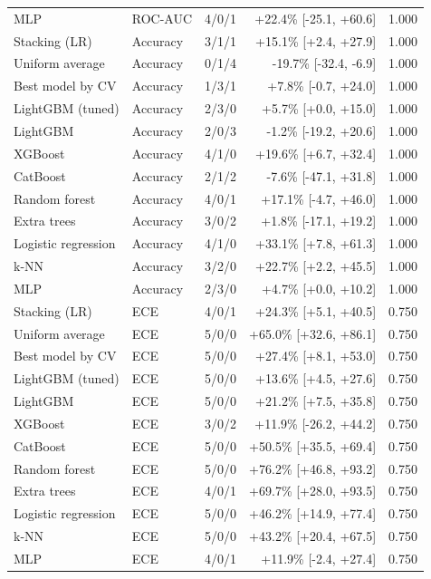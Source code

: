 \begin{tabular}{llcrr}
MLP & ROC-AUC & 4/0/1 & +22.4\% [-25.1, +60.6] & 1.000\\
Stacking (LR) & Accuracy & 3/1/1 & +15.1\% [+2.4, +27.9] & 1.000\\
Uniform average & Accuracy & 0/1/4 & -19.7\% [-32.4, -6.9] & 1.000\\
Best model by CV & Accuracy & 1/3/1 & +7.8\% [-0.7, +24.0] & 1.000\\
LightGBM (tuned) & Accuracy & 2/3/0 & +5.7\% [+0.0, +15.0] & 1.000\\
LightGBM & Accuracy & 2/0/3 & -1.2\% [-19.2, +20.6] & 1.000\\
XGBoost & Accuracy & 4/1/0 & +19.6\% [+6.7, +32.4] & 1.000\\
CatBoost & Accuracy & 2/1/2 & -7.6\% [-47.1, +31.8] & 1.000\\
Random forest & Accuracy & 4/0/1 & +17.1\% [-4.7, +46.0] & 1.000\\
Extra trees & Accuracy & 3/0/2 & +1.8\% [-17.1, +19.2] & 1.000\\
Logistic regression & Accuracy & 4/1/0 & +33.1\% [+7.8, +61.3] & 1.000\\
k-NN & Accuracy & 3/2/0 & +22.7\% [+2.2, +45.5] & 1.000\\
MLP & Accuracy & 2/3/0 & +4.7\% [+0.0, +10.2] & 1.000\\
Stacking (LR) & ECE & 4/0/1 & +24.3\% [+5.1, +40.5] & 0.750\\
Uniform average & ECE & 5/0/0 & +65.0\% [+32.6, +86.1] & 0.750\\
Best model by CV & ECE & 5/0/0 & +27.4\% [+8.1, +53.0] & 0.750\\
LightGBM (tuned) & ECE & 5/0/0 & +13.6\% [+4.5, +27.6] & 0.750\\
LightGBM & ECE & 5/0/0 & +21.2\% [+7.5, +35.8] & 0.750\\
XGBoost & ECE & 3/0/2 & +11.9\% [-26.2, +44.2] & 0.750\\
CatBoost & ECE & 5/0/0 & +50.5\% [+35.5, +69.4] & 0.750\\
Random forest & ECE & 5/0/0 & +76.2\% [+46.8, +93.2] & 0.750\\
Extra trees & ECE & 4/0/1 & +69.7\% [+28.0, +93.5] & 0.750\\
Logistic regression & ECE & 5/0/0 & +46.2\% [+14.9, +77.4] & 0.750\\
k-NN & ECE & 5/0/0 & +43.2\% [+20.4, +67.5] & 0.750\\
MLP & ECE & 4/0/1 & +11.9\% [-2.4, +27.4] & 0.750\\
\bottomrule
\end{tabular}
